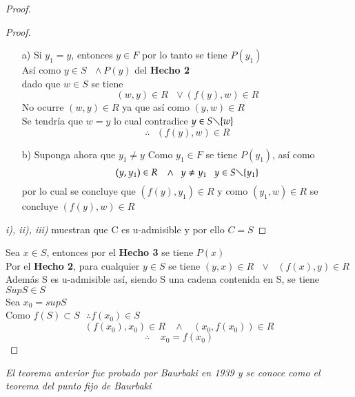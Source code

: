 \begin{proof}
\begin{proof}
\begin{itemize}
\begin{itemize}
\item[a)] Si $ y_{1} = y $, entonces $ y \in F $ por lo tanto se tiene $ P(y_{1}) $\\
Así como $ y \in S \ \ \ \wedge P(y) $ del \textbf{Hecho 2}\\
dado que $ w \in S $ se tiene 
$$ (w,y) \in R \ \ \ \vee (f(y),w) \in R $$
No ocurre $ (w,y) \in R $ ya que así como $ (y,w) \in R $ \\
Se tendría que $ w=y $ lo cual contradice $ y \in S \diagdown  \lbrace w \rbrace $
$$ \therefore \ \ \ (f(y),w) \in R $$
\item[b)]Suponga ahora que $ y_{1} \neq y $ Como $ y_{1} \in F $ se tiene $ P(y_{1}) $, así como\\
$$ (y, y_{1}) \in R \ \ \ \wedge \ \ y \neq y_{1} \ \ \  y \in S \diagdown \lbrace y_{1} \rbrace  $$
por lo cual se concluye que  $ (f(y), y_{1}) \in R $ y como $ (y_{1}, w) \in R $ se  concluye  $ (f(y),w) \in R $
\end{itemize}
  
\end{itemize}
\textit{i), ii), iii)} muestran que C es u-admisible y por ello $ C=S $
\end{proof}
Sea $ x \in S $, entonces por el \textbf{Hecho 3} se tiene $ P(x) $ \\
Por el \textbf{Hecho 2}, para cualquier $ y \in S $ se tiene $ (y,x) \in R \ \ \ \vee \ \ \  (f(x),y)\in R $\\
Además S es u-admisible así, siendo S una cadena contenida en S, se tiene $ SupS \in S $ \\
Sea $ x_{0} = supS $\\
Como $ f(S) \subset S \ \ \ \therefore f(x_{0}) \in S $
$$(f(x_{0}),x_{0}) \in R \ \ \ \ \wedge \ \ \ \ (x_{0}, f(x_{0})) \in R$$
$$\therefore \ \ \ \ \ x_{0}=f(x_{0})$$

\end{proof} 

\textit{El teorema anterior fue probado por Baurbaki en 1939 y se conoce como el teorema del punto fijo de Baurbaki}

\newpage


